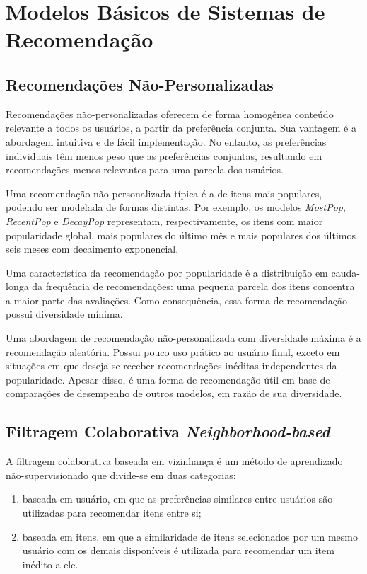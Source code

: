 \section{Modelos Básicos de Sistemas de Recomendação}
\subsection{Recomendações Não-Personalizadas}
Recomendações não-personalizadas oferecem de forma homogênea conteúdo relevante
a todos os usuários, a partir da preferência conjunta. Sua vantagem é a
abordagem intuitiva e de fácil implementação. No entanto, as preferências
individuais têm menos peso que as preferências conjuntas, resultando em
recomendações menos relevantes para uma parcela dos usuários.

Uma recomendação não-personalizada típica é a de itens mais populares, podendo
ser modelada de formas distintas. Por exemplo, os modelos \textit{MostPop},
\textit{RecentPop} e \textit{DecayPop} representam, respectivamente, os itens
com maior popularidade global, mais populares do último mês e mais populares dos
últimos seis meses com decaimento exponencial.

Uma característica da recomendação por popularidade é a distribuição em
cauda-longa da frequência de recomendações: uma pequena parcela dos itens
concentra a maior parte das avaliações. Como consequência, essa forma de
recomendação possui diversidade mínima.

Uma abordagem de recomendação não-personalizada com diversidade máxima é a
recomendação aleatória. Possui pouco uso prático ao usuário final, exceto em
situações em que deseja-se receber recomendações inéditas independentes da
popularidade. Apesar disso, é uma forma de recomendação útil em base de
comparações de desempenho de outros modelos, em razão de sua diversidade.

\subsection{Filtragem Colaborativa \textit{Neighborhood-based}} A filtragem
colaborativa baseada em vizinhança é um método de aprendizado não-supervisionado
que divide-se em duas categorias:
\begin{enumerate}
    \item baseada em usuário, em
que as preferências similares entre usuários são utilizadas para recomendar
itens entre si;
    \item baseada em itens, em que a similaridade de itens selecionados
por um mesmo usuário com os demais disponíveis é utilizada para recomendar um
item inédito a ele.
\end{enumerate}

